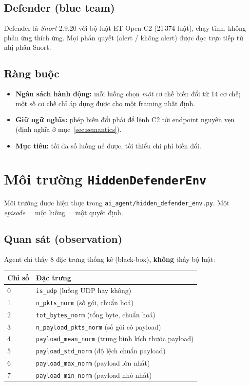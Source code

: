 \documentclass[12pt,a4paper]{report}
\newcommand{\Snort}{\textit{Snort}}
\begin{document}
\subsection{Defender (blue team)}
Defender là \Snort{} 2.9.20 với bộ luật ET Open C2 (21\,374 luật), chạy tĩnh, không
phản ứng thích ứng. Mọi phán quyết (alert / không alert) được đọc trực tiếp từ nhị
phân Snort.

\subsection{Ràng buộc}
\begin{itemize}
  \item \textbf{Ngân sách hành động:} mỗi luồng chọn \emph{một} cơ chế biến đổi từ 14
        cơ chế; một số cơ chế chỉ áp dụng được cho một framing nhất định.
  \item \textbf{Giữ ngữ nghĩa:} phép biến đổi phải để lệnh C2 tới endpoint nguyên vẹn
        (định nghĩa ở mục~\ref{sec:semantics}).
  \item \textbf{Mục tiêu:} tối đa số luồng né được, tối thiểu chi phí biến đổi.
\end{itemize}

\section{Môi trường \texttt{HiddenDefenderEnv}}

Môi trường được hiện thực trong \texttt{ai\_agent/hidden\_defender\_env.py}. Một
\emph{episode} = một luồng = một quyết định.

\subsection{Quan sát (observation)}
Agent chỉ thấy 8 đặc trưng thống kê (black-box), \textbf{không} thấy bộ luật:
\begin{center}
\begin{tabular}{ll}
\toprule
Chỉ số & Đặc trưng \\
\midrule
0 & \texttt{is\_udp} (luồng UDP hay không) \\
1 & \texttt{n\_pkts\_norm} (số gói, chuẩn hoá) \\
2 & \texttt{tot\_bytes\_norm} (tổng byte, chuẩn hoá) \\
3 & \texttt{n\_payload\_pkts\_norm} (số gói có payload) \\
4 & \texttt{payload\_mean\_norm} (trung bình kích thước payload) \\
5 & \texttt{payload\_std\_norm} (độ lệch chuẩn payload) \\
6 & \texttt{payload\_max\_norm} (payload lớn nhất) \\
7 & \texttt{payload\_min\_norm} (payload nhỏ nhất) \\
\bottomrule
\end{tabular}
\end{center}
\end{document}

